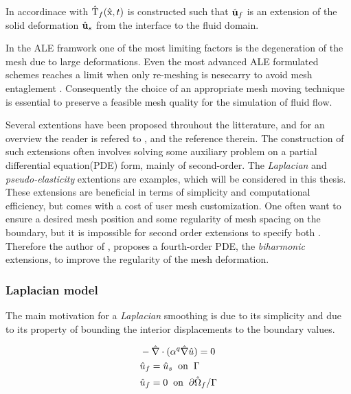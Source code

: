 In accordinace with   $\text{\^{T}}_f(\text{\^{x}}, t) $ is constructed such that $\hat{\mathbf{u}}_f$ is an extension of the solid deformation $\hat{\mathbf{u}}_s$ from the interface to the fluid domain. 


In the ALE framwork one of the most limiting factors is the degeneration of the mesh due to large deformations. Even the most advanced ALE formulated schemes reaches a limit when only re-meshing is nesecarry to avoid mesh entaglement \cite{Wall12006}. Consequently the choice of an appropriate mesh moving technique is essential to preserve a feasible mesh quality for the simulation of fluid flow.

Several extentions have been proposed throuhout the litterature, and for an overview the reader is refered to \cite{MM2016}, and the reference therein. The construction of such extensions often involves solving some auxiliary problem on a partial differential equation(PDE) form, mainly of second-order. The \textit{Laplacian} and \textit{pseudo-elasticity} extentions are examples, which will be considered in this thesis. These extensions are beneficial in terms of simplicity and computational efficiency, but comes with a cost of user mesh customization. One often want to ensure a desired mesh position and some regularity of mesh spacing on the boundary, but it is impossible for second order extensions to specify both \cite{Helenbrook2003}. Therefore the author of \cite{Helenbrook2003}, proposes a fourth-order PDE, the \textit{biharmonic} extensions, to improve the regularity of the mesh deformation. \\

\subsubsection*{Laplacian model}

The main motivation for a \textit{Laplacian} smoothing is due to its simplicity and due to its property of bounding the interior displacements to the boundary values. 

\begin{align*}
&- \hat{\nabla} \cdot (\alpha^q \hat{\nabla} \hat{u}) = 0 \\
&\hat{u}_f = \hat{u}_s \hspace{2mm} \text{on} \hspace{2mm}  \Gamma \\
&\hat{u}_f = 0 \hspace{2mm} \text{on} \hspace{2mm} \partial \hat{\Omega}_f / \Gamma 
\end{align*}

